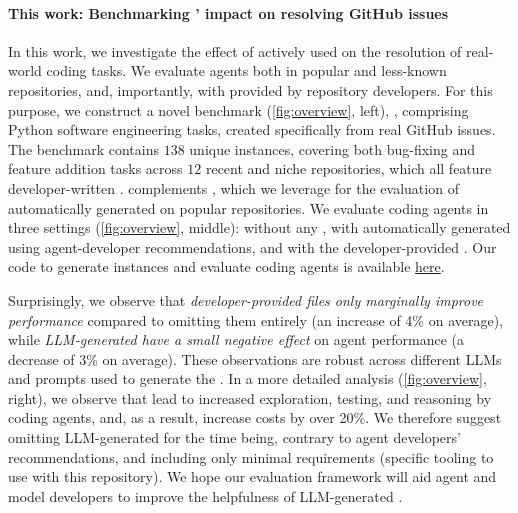 \paragraph{This work: Benchmarking \agentsmds{}' impact on resolving GitHub issues}
In this work, we investigate the effect of actively used \agentsmds{} on the resolution of real-world coding tasks.
We evaluate agents both in popular and less-known repositories, and, importantly, with \agentsmds{} provided by repository developers.
For this purpose, we construct a novel benchmark (\cref{fig:overview}, left), \planbench{}, comprising Python software engineering tasks, created specifically from real GitHub issues.
The benchmark contains $138$ unique instances, covering both bug-fixing and feature addition tasks across $12$ recent and niche repositories, which all feature developer-written \agentsmds{}. \planbench{} complements \swebench{}, which we leverage for the evaluation of automatically generated \agentsmds{} on popular repositories.
We evaluate coding agents in three settings (\cref{fig:overview}, middle): without any \agentsmd{}, with \agentsmds{} automatically generated using agent-developer recommendations, and with the developer-provided \agentsmd{}.
Our code to generate \planbench{} instances and evaluate coding agents is available \href{https://github.com/eth-sri/agentbench}{here}.

Surprisingly, we observe that \emph{developer-provided files only marginally improve performance} compared to omitting them entirely (an increase of 4\% on average), while \emph{LLM-generated \agentsmds{} have a small negative effect} on agent performance (a decrease of 3\% on average).
These observations are robust across different LLMs and prompts used to generate the \agentsmds{}.
In a more detailed analysis (\cref{fig:overview}, right), we observe that \agentsmds{} lead to increased exploration, testing, and reasoning by coding agents, and, as a result, increase costs by over 20\%.
We therefore suggest omitting LLM-generated \agentsmds{} for the time being, contrary to agent developers' recommendations, and including only minimal requirements (\eg specific tooling to use with this repository).
We hope our evaluation framework will aid agent and model developers to improve the helpfulness of LLM-generated \agentsmds{}.

